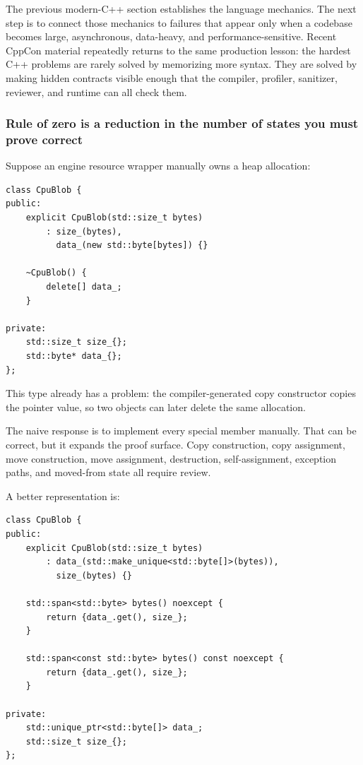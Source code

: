 \hypertarget{01-foundations-i-ch005-cppcon-deepening-engine-c-is-mostly-about-proving-lifetime-layout-and-execution-contracts}{}

The previous modern-C++ section establishes the language mechanics. The next step is to connect those mechanics to failures that appear only when a codebase becomes large, asynchronous, data-heavy, and performance-sensitive. Recent CppCon material repeatedly returns to the same production lesson: the hardest C++ problems are rarely solved by memorizing more syntax. They are solved by making hidden contracts visible enough that the compiler, profiler, sanitizer, reviewer, and runtime can all check them.

\subsubsection{Rule of zero is a reduction in the number of states you must prove correct}\label{01-foundations-i-ch005-rule-of-zero-is-a-reduction-in-the-number-of-states-you-must-prove-correct}

\hypertarget{01-foundations-i-ch005-rule-of-zero-is-a-reduction-in-the-number-of-states-you-must-prove-correct}{}

Suppose an engine resource wrapper manually owns a heap allocation:

\begin{verbatim}
class CpuBlob {
public:
    explicit CpuBlob(std::size_t bytes)
        : size_(bytes),
          data_(new std::byte[bytes]) {}

    ~CpuBlob() {
        delete[] data_;
    }

private:
    std::size_t size_{};
    std::byte* data_{};
};
\end{verbatim}

This type already has a problem: the compiler-generated copy constructor copies the pointer value, so two objects can later delete the same allocation.

The naive response is to implement every special member manually. That can be correct, but it expands the proof surface. Copy construction, copy assignment, move construction, move assignment, destruction, self-assignment, exception paths, and moved-from state all require review.

A better representation is:

\begin{verbatim}
class CpuBlob {
public:
    explicit CpuBlob(std::size_t bytes)
        : data_(std::make_unique<std::byte[]>(bytes)),
          size_(bytes) {}

    std::span<std::byte> bytes() noexcept {
        return {data_.get(), size_};
    }

    std::span<const std::byte> bytes() const noexcept {
        return {data_.get(), size_};
    }

private:
    std::unique_ptr<std::byte[]> data_;
    std::size_t size_{};
};
\end{verbatim}

